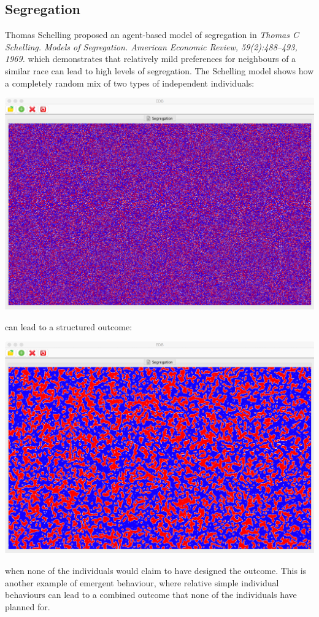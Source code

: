 \documentclass[5p,times]{elsarticle}
\begin{document}
\subsection{Segregation}

\label{sec:segregation}

Thomas Schelling proposed an agent-based model of segregation in {\it Thomas C Schelling. Models of Segregation. American Economic Review, 59(2):488–493, 1969.} which demonstrates that relatively mild preferences for neighbours of a similar race can lead to high levels of segregation. The Schelling model shows how a completely random mix of two types of independent individuals:
\begin{center}
\includegraphics[width=0.8\columnwidth]{segregation1}
\end{center}
can lead to a structured outcome:
\begin{center}
\includegraphics[width=0.8\columnwidth]{segregation2}
\end{center}
when none of the individuals would claim to have designed the outcome. This is another example of emergent behaviour, where relative simple individual behaviours can lead to a combined outcome that none of the individuals have planned for.
\end{document}
